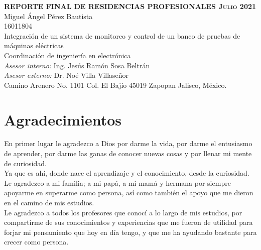 \documentclass[12pt,titlepage]{article}
\begin{document}
\begin{titlepage}
\begin{center}
 \hspace{17mm}\textbf{\textsc{REPORTE FINAL DE RESIDENCIAS PROFESIONALES \newline
 Julio 2021}}\\[10mm]
  Miguel Ángel Pérez Bautista \\[4.5mm]
  16011804 \\[4.5mm]
 Integración de un sistema de monitoreo y control de un banco de pruebas de máquinas eléctricas\\[4.5mm]
 Coordinación de ingeniería en electrónica\\[4.5mm]
 \vspace{5mm}
\textsl{Asesor interno: }     Ing. Jesús Ramón Sosa Beltrán\\[5mm]
\textsl{Asesor externo: } Dr. Noé Villa Villaseñor\\[5mm]
 \vspace{8mm}
\hspace*{1.0cm} Camino Arenero No. 1101 Col. El Bajío 45019 Zapopan Jalisco, México.
\end{center}
\end{titlepage} %
\newpage %
\section*{Agradecimientos}
En primer lugar le agradezco a Dios por darme la vida, por darme el entusiasmo de aprender, por darme las ganas de conocer nuevas cosas y por llenar mi mente de curiosidad. \\

Ya que es ahí, donde nace el aprendizaje y el conocimiento, desde la curiosidad. \\

Le agradezco a mi familia; a mi papá, a mi mamá y hermana por siempre apoyarme en superarme como persona, así como también el apoyo que me dieron en el camino de mis estudios. \\



Le agradezco a todos los  profesores que conocí a lo largo de mis estudios, por compartirme de sus conocimientos y experiencias que me fueron de utilidad para forjar mi pensamiento que hoy en día tengo, y que me ha ayudando bastante para crecer como persona. \\
\end{document}
